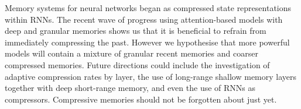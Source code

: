 Memory systems for neural networks began as compressed state representations within RNNs. The recent wave of progress using attention-based models with deep and granular memories shows us that it is beneficial to refrain from immediately compressing the past. However we hypothesise that more powerful models will contain a mixture of granular recent memories and coarser compressed memories. Future directions could include the investigation of adaptive compression rates by layer, the use of long-range shallow memory layers together with deep short-range memory, and even the use of RNNs as compressors. Compressive memories should not be forgotten about just yet.

\ificlrfinal


